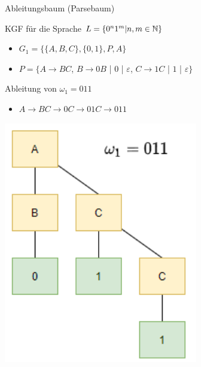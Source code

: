 \begin{minipage}{0.8\linewidth}
    \begin{definition}{Ableitungsbaum (Parsebaum)} 
        
        KGF für die Sprache $L=\{0^{n} 1^{m} | n, m \in \mathbb{N}\}$
        \begin{itemize}
        \item $G_{1}=\{\{A, B, C\},\{0,1\}, P, A\}$
        \item $P=\{A \rightarrow B C$, $B \rightarrow 0 B$ | $0$ | $\varepsilon$, $C \rightarrow 1 C$ | $1$ | $\varepsilon\}$
        \end{itemize}
        \vspace*{2mm}
    
        Ableitung von $\omega_{1}=011$
    
        \begin{itemize}
        \item $A \rightarrow B C \rightarrow 0 C \rightarrow 01 C \rightarrow 011$
        \end{itemize}
    \end{definition}
\end{minipage}
\begin{minipage}{0.2\linewidth}
    \includegraphics[width=1\linewidth]{ableitungsbaum.png}
\end{minipage}



